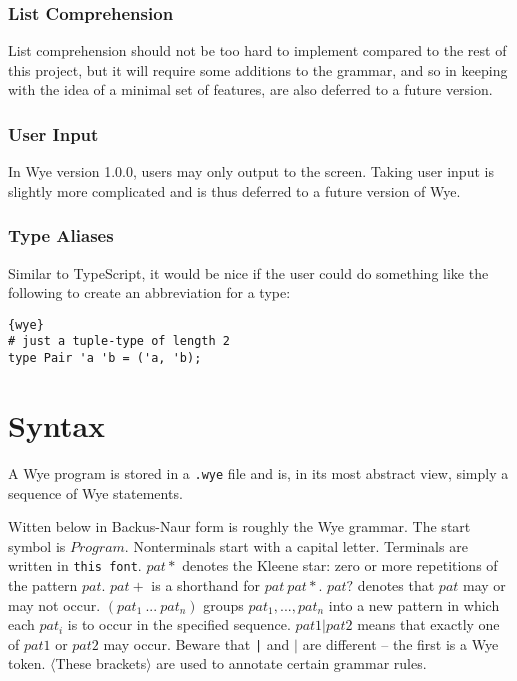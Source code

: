 \documentclass[a4paper, 12pt]{article}
\newcommand{\version}{1.0.0}
\begin{document}
\subsubsection{List Comprehension}
List comprehension should not be too hard to implement compared to the rest of this project, but it will require some additions to the grammar, and so in keeping with the idea of a minimal set of features, are also deferred to a future version.

\subsubsection{User Input}
In Wye version \version{}, users may only output to the screen. Taking user input is slightly more complicated and is thus deferred to a future version of Wye.

\subsubsection{Type Aliases}
Similar to TypeScript, it would be nice if the user could do something like the following to create an abbreviation for a type:
\begin{lstlisting}{wye}
# just a tuple-type of length 2
type Pair 'a 'b = ('a, 'b);
\end{lstlisting}

\section{Syntax}
A Wye program is stored in a \texttt{.wye} file and is, in its most abstract view, simply a sequence of Wye statements.

Witten below in Backus-Naur form is roughly the Wye grammar. The start symbol is $Program$. Nonterminals start with a capital letter. Terminals are written in \texttt{this font}. $pat*$ denotes the Kleene star: zero or more repetitions of the pattern $pat$. $pat+$ is a shorthand for $pat\: pat*$. $pat?$ denotes that $pat$ may or may not occur. $( pat_1\:...\: pat_n )$ groups $pat_1, ..., pat_n$ into a new pattern in which each $pat_i$ is to occur in the specified sequence. $pat1 | pat2$ means that exactly one of $pat1$ or $pat2$ may occur. Beware that \texttt{|} and $|$ are different -- the first is a Wye token. $\langle$These brackets$\rangle$ are used to annotate certain grammar rules.
\end{document}
